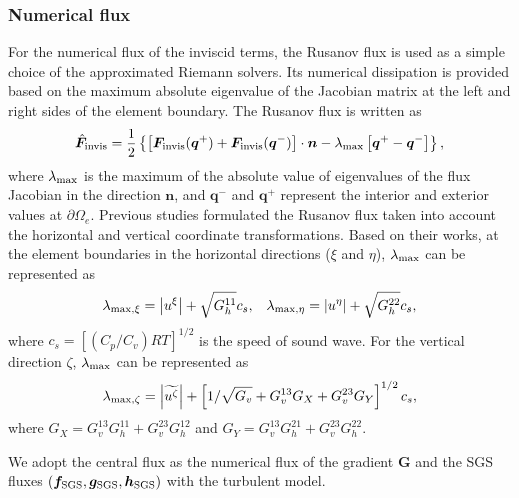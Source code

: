 \subsubsection{Numerical flux}
For the numerical flux of the inviscid terms, 
the Rusanov flux \citep{Rusanov1961} is used 
as a simple choice of the approximated Riemann solvers. 
Its numerical dissipation is provided based on the maximum absolute eigenvalue of the Jacobian matrix 
at the left and right sides of the element boundary. 
The Rusanov flux is written as 
\begin{equation}
 \hat{\bm{F}}_{\rm invis} 
 = \dfrac{1}{2}\left\{ \left[ \bm{F}_{\rm invis}(\bm{q}^+) + \bm{F}_{\rm invis}(\bm{q}^-) \right]\cdot\bm{n} - \lambda_{\rm max} \left[\bm{q}^+ - \bm{q}^- \right] \right\}, 
\end{equation}
where 
$\lambda_{\rm max}$ is the maximum of the absolute value of eigenvalues of the flux Jacobian in the direction $\bm{n}$, and 
$\bm{q}^-$ and $\bm{q}^+$ represent the interior and exterior values at $\partial \Omega_e$. 
Previous studies \citep[e.g.,][]{li2020development} formulated 
the Rusanov flux taken into account the horizontal and vertical coordinate transformations. 
Based on their works, 
at the element boundaries in the horizontal directions ($\xi$ and $\eta$), 
$\lambda_{\rm max}$ can be represented as  
\begin{equation}
 \lambda_{{\rm max},\xi}=\left|u^\xi \right| + \sqrt{G_h^{11}} c_s, 
\;\;\; 
\lambda_{{\rm max},\eta}=\left|u^\eta \right| + \sqrt{G_h^{22}} c_s, 
\end{equation}
where $c_s=[(C_p/C_v) RT]^{1/2}$ is the speed of sound wave.
For the vertical direction $\zeta$, 
$\lambda_{\rm max}$ can be represented as 
\begin{equation}
  \lambda_{{\rm max},\zeta} 
    = \left|\widetilde{u^\zeta} \right| 
    + \left[ 1/\sqrt{G_v} + G_v^{13}G_X + G_v^{23}G_Y \right]^{1/2} c_s, 
\end{equation}
where
$G_X=G_v^{13}G_h^{11} + G_v^{23}G_h^{12}$ 
and 
$G_Y=G_v^{13}G_h^{21} + G_v^{23}G_h^{22}$. 


We adopt the central flux  
as the numerical flux of the gradient $\bm{G}$ and 
the SGS fluxes $(\bm{f}_{\rm SGS},\bm{g}_{\rm SGS},\bm{h}_{\rm SGS})$ 
with the turbulent model. 


